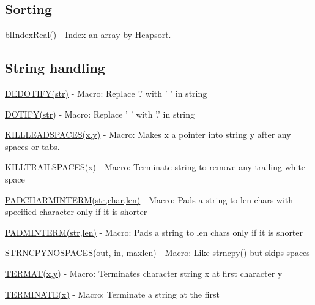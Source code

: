 \subsection*{Sorting }


\begin{DoxyItemize}
\item \hyperlink{general_8h_ab497c8d98d541e0bb843b002439641d4}{bl\-Index\-Real()} -\/ Index an array by Heapsort.
\end{DoxyItemize}

\subsection*{String handling }


\begin{DoxyItemize}
\item \hyperlink{macros_8h_aaaae083fd26ba0d19105f05510a2009d}{D\-E\-D\-O\-T\-I\-F\-Y(str)} -\/ Macro\-: Replace '.' with ' ' in string
\item \hyperlink{macros_8h_ab7e50c0e4b5fb79a9490a9946139761d}{D\-O\-T\-I\-F\-Y(str)} -\/ Macro\-: Replace ' ' with '.' in string
\item \hyperlink{macros_8h_a1b8cbb77f6df1b328324b217ea7eebd3}{K\-I\-L\-L\-L\-E\-A\-D\-S\-P\-A\-C\-E\-S(x,y)} -\/ Macro\-: Makes x a pointer into string y after any spaces or tabs.
\item \hyperlink{macros_8h_a01c5f3b95fb9aa9efbdaf1f2b77cd900}{K\-I\-L\-L\-T\-R\-A\-I\-L\-S\-P\-A\-C\-E\-S(x)} -\/ Macro\-: Terminate string to remove any trailing white space
\item \hyperlink{macros_8h_ae40c354ba544d11cc47fe6cc74b4e966}{P\-A\-D\-C\-H\-A\-R\-M\-I\-N\-T\-E\-R\-M(str,char,len)} -\/ Macro\-: Pads a string to len chars with specified character only if it is shorter
\item \hyperlink{macros_8h_a8db1217a164f5997e33c5fa121f93ccf}{P\-A\-D\-M\-I\-N\-T\-E\-R\-M(str,len)} -\/ Macro\-: Pads a string to len chars only if it is shorter
\item \hyperlink{macros_8h_adf782f359235d2bab86224421b186e27}{S\-T\-R\-N\-C\-P\-Y\-N\-O\-S\-P\-A\-C\-E\-S(out, in, maxlen)} -\/ Macro\-: Like strncpy() but skips spaces
\item \hyperlink{macros_8h_a33cbc27128739739a766304271838628}{T\-E\-R\-M\-A\-T(x,y)} -\/ Macro\-: Terminates character string x at first character y
\item \hyperlink{macros_8h_aacb586bd2f3f322f647a94819e1315c5}{T\-E\-R\-M\-I\-N\-A\-T\-E(x)} -\/ Macro\-: Terminate a string at the first \par


\end{DoxyItemize}
